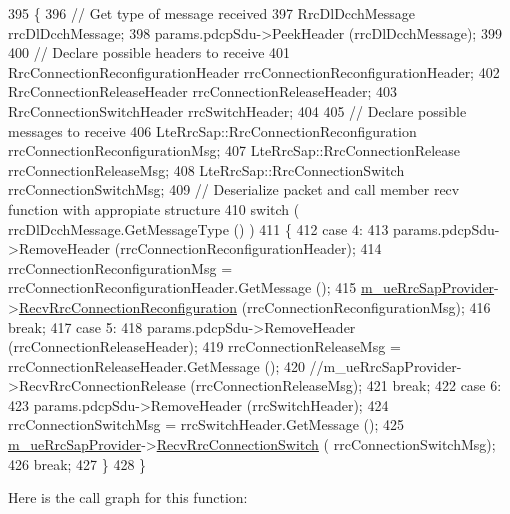 \begin{DoxyCode}
395 \{
396   \textcolor{comment}{// Get type of message received}
397   RrcDlDcchMessage rrcDlDcchMessage;
398   params.pdcpSdu->PeekHeader (rrcDlDcchMessage);
399 
400   \textcolor{comment}{// Declare possible headers to receive}
401   RrcConnectionReconfigurationHeader rrcConnectionReconfigurationHeader;
402   RrcConnectionReleaseHeader rrcConnectionReleaseHeader;
403   RrcConnectionSwitchHeader rrcSwitchHeader;
404 
405   \textcolor{comment}{// Declare possible messages to receive}
406   LteRrcSap::RrcConnectionReconfiguration rrcConnectionReconfigurationMsg;
407   LteRrcSap::RrcConnectionRelease rrcConnectionReleaseMsg;
408   LteRrcSap::RrcConnectionSwitch rrcConnectionSwitchMsg;
409   \textcolor{comment}{// Deserialize packet and call member recv function with appropiate structure}
410   \textcolor{keywordflow}{switch} ( rrcDlDcchMessage.GetMessageType () )
411     \{
412     \textcolor{keywordflow}{case} 4:
413       params.pdcpSdu->RemoveHeader (rrcConnectionReconfigurationHeader);
414       rrcConnectionReconfigurationMsg = rrcConnectionReconfigurationHeader.GetMessage ();
415       \hyperlink{classns3_1_1MmWaveLteUeRrcProtocolReal_ae4324a866bc59d059e7938a12244eb1f}{m\_ueRrcSapProvider}->\hyperlink{classns3_1_1LteUeRrcSapProvider_a16f321a91134b1597bcf3a9e85eba39d}{RecvRrcConnectionReconfiguration}
       (rrcConnectionReconfigurationMsg);
416       \textcolor{keywordflow}{break};
417     \textcolor{keywordflow}{case} 5:
418       params.pdcpSdu->RemoveHeader (rrcConnectionReleaseHeader);
419       rrcConnectionReleaseMsg = rrcConnectionReleaseHeader.GetMessage ();
420       \textcolor{comment}{//m\_ueRrcSapProvider->RecvRrcConnectionRelease (rrcConnectionReleaseMsg);}
421       \textcolor{keywordflow}{break};
422     \textcolor{keywordflow}{case} 6:
423       params.pdcpSdu->RemoveHeader (rrcSwitchHeader);
424       rrcConnectionSwitchMsg = rrcSwitchHeader.GetMessage ();
425       \hyperlink{classns3_1_1MmWaveLteUeRrcProtocolReal_ae4324a866bc59d059e7938a12244eb1f}{m\_ueRrcSapProvider}->\hyperlink{classns3_1_1LteUeRrcSapProvider_ade488446e890f38224f21e37ea3db2a2}{RecvRrcConnectionSwitch} (
      rrcConnectionSwitchMsg);
426       \textcolor{keywordflow}{break};
427     \}
428 \}
\end{DoxyCode}


Here is the call graph for this function\+:


